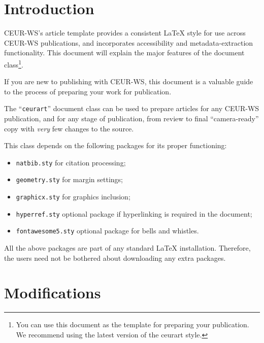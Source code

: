 \documentclass[
]{ceurart}
\begin{document}
\maketitle

\section{Introduction}

CEUR-WS's article template provides a consistent \LaTeX{} style for
use across CEUR-WS publications, and incorporates accessibility and
metadata-extraction functionality. This document will explain the
major features of the document class\footnote{You can use this
  document as the template for preparing your publication. We
  recommend using the latest version of the ceurart style.}.

If you are new to publishing with CEUR-WS, this document is a valuable
guide to the process of preparing your work for publication.

The ``\verb|ceurart|'' document class can be used to prepare articles
for any CEUR-WS publication, and for any stage of publication, from
review to final ``camera-ready'' copy with {\itshape very} few changes
to the source.

This class depends on the following packages
for its proper functioning:

\begin{itemize}
\item \verb|natbib.sty| for citation processing;
\item \verb|geometry.sty| for margin settings;
\item \verb|graphicx.sty| for graphics inclusion;
\item \verb|hyperref.sty| optional package if hyperlinking is required in
  the document;
\item \verb|fontawesome5.sty| optional package for bells and whistles.
\end{itemize}

All the above packages are part of any
standard \LaTeX{} installation.
Therefore, the users need not be
bothered about downloading any extra packages.

\section{Modifications}
\end{document}
